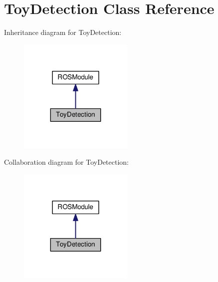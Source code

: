 \hypertarget{classToyDetection}{}\section{Toy\+Detection Class Reference}
\label{classToyDetection}


Inheritance diagram for Toy\+Detection\+:
\nopagebreak
\begin{figure}[H]
\begin{center}
\leavevmode
\includegraphics[width=155pt]{classToyDetection__inherit__graph}
\end{center}
\end{figure}


Collaboration diagram for Toy\+Detection\+:
\nopagebreak
\begin{figure}[H]
\begin{center}
\leavevmode
\includegraphics[width=155pt]{classToyDetection__coll__graph}
\end{center}
\end{figure}

